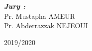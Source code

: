 \begin{center}
  {\large \bfseries \itshape Jury :}\\[0.2cm]
  Pr. Mustapha AMEUR\\
  Pr. Abderrazzak NEJEOUI\\

  \vfill

  2019/2020

\end{center}